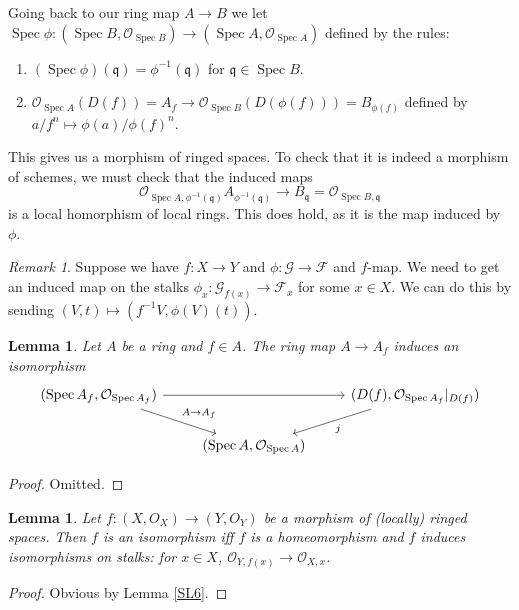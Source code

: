 \documentclass{article}
\newcommand{\fr}{\mathfrak}
\newcommand{\OO}{\mathcal{O}}
\DeclareMathOperator{\Spec}{Spec}
\theoremstyle{plain}
\newtheorem{lem}[thm]{Lemma}
\theoremstyle{definition}
\theoremstyle{remark}
\newtheorem*{rem}{Remark}
\begin{document}
Going back to our ring map $A\to B$ we let $\Spec\phi:(\Spec B,\OO_{\Spec B})\to(\Spec A,\OO_{\Spec A})$ defined by the rules:
\begin{enumerate}
\item $(\Spec \phi)(\fr q)=\phi^{-1}(\fr q)$ for $\fr q\in\Spec B$.
\item $\OO_{\Spec A}(D(f))=A_f\to\OO_{\Spec B}(D(\phi(f)))=B_{\phi(f)}$ defined by $a/f^n\mapsto \phi(a)/\phi(f)^n$.
\end{enumerate}
This gives us a morphism of ringed spaces. To check that it is indeed a morphism of schemes, we must check that the induced maps
\[\OO_{\Spec A,\phi^{-1}(\fr q)}A_{\phi^{-1}(\fr q)}\to B_\fr q=\OO_{\Spec B,\fr q}\]
is a local homorphism of local rings. This does hold, as it is the map induced by $\phi$.

\begin{rem}
Suppose we have $f:X\to Y$ and $\phi:\mathcal{G}\to\mathcal{F}$ and $f$-map. We need to get an induced map on the stalks $\phi_x:\mathcal{G}_{f(x)}\to \mathcal{F}_x$ for some $x\in X$. We can do this by sending $(V,t)\mapsto (f^{-1}V,\phi(V)(t))$.
\end{rem}

\begin{lem}
\label{SL4}
Let $A$ be a ring and $f\in A$. The ring map $A\to A_f$ induces an isomorphism 
\begin{equation*}
\begin{tikzcd}
(\Spec A_f,\OO_{\Spec A_f})\arrow{rr}\arrow{rd}{A\to A_f}&& (D(f),\OO_{\Spec A_f}|_{D(f)})\arrow{ld}{j}\\
&(\Spec A,\OO_{\Spec A})&
\end{tikzcd}
\end{equation*}
\end{lem}
\begin{proof}
Omitted.
\end{proof}

\begin{lem}
\label{SL5}
Let $f:(X,O_X)\to (Y,O_Y)$ be a morphism of (locally) ringed spaces. Then $f$ is an isomorphism iff $f$ is a homeomorphism and $f$ induces isomorphisms on stalks: for $x\in X$, $\OO_{Y,f(x)}\to\OO_{X,x}$.
\end{lem}
\begin{proof}
Obvious by Lemma \ref{SL6}.
\end{proof}
\end{document}
